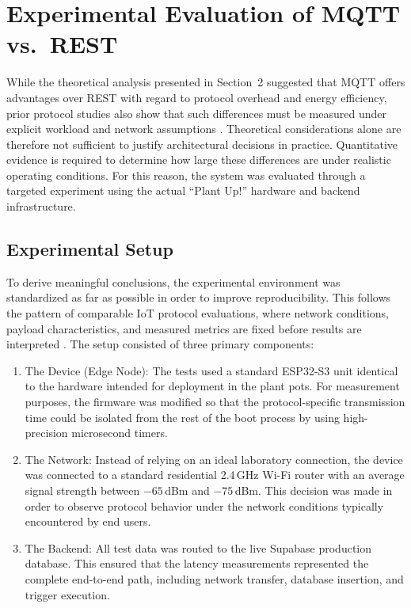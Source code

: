 \section{Experimental Evaluation of MQTT vs.\ REST}

While the theoretical analysis presented in Section~2 suggested that MQTT offers advantages over REST with regard to protocol overhead and energy efficiency, prior protocol studies also show that such differences must be measured under explicit workload and network assumptions \cite{thangavel2014mqttCoap, seoane2021CoapMqttSecurity, yamin2018MqttCoap, chenKunz2016IotProtocols, jara2023mqtt}. Theoretical considerations alone are therefore not sufficient to justify architectural decisions in practice. Quantitative evidence is required to determine how large these differences are under realistic operating conditions. For this reason, the system was evaluated through a targeted experiment using the actual ``Plant Up!'' hardware and backend infrastructure.

\subsection{Experimental Setup}
To derive meaningful conclusions, the experimental environment was standardized as far as possible in order to improve reproducibility. This follows the pattern of comparable IoT protocol evaluations, where network conditions, payload characteristics, and measured metrics are fixed before results are interpreted \cite{thangavel2014mqttCoap, seoane2021CoapMqttSecurity, chenKunz2016IotProtocols}. The setup consisted of three primary components:

\begin{enumerate}
    \item The Device (Edge Node): The tests used a standard ESP32-S3 unit identical to the hardware intended for deployment in the plant pots. For measurement purposes, the firmware was modified so that the protocol-specific transmission time could be isolated from the rest of the boot process by using high-precision microsecond timers.
    \item The Network: Instead of relying on an ideal laboratory connection, the device was connected to a standard residential 2.4\,GHz Wi-Fi router with an average signal strength between $-65$\,dBm and $-75$\,dBm. This decision was made in order to observe protocol behavior under the network conditions typically encountered by end users.
    \item The Backend: All test data was routed to the live Supabase production database. This ensured that the latency measurements represented the complete end-to-end path, including network transfer, database insertion, and trigger execution.
\end{enumerate}

